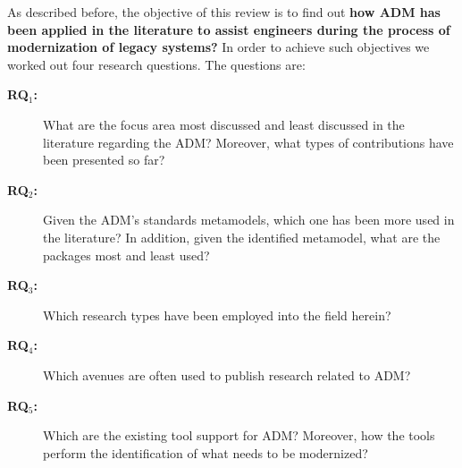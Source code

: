 

As described before, the objective of this review is to find out \textbf{how ADM has been applied in the literature to assist engineers during the process of modernization of legacy systems?} In order to achieve such objectives we worked out four research questions. The questions are:

\begin{description}

\item[\textbf{RQ$_1$:}] What are the focus area most discussed and least discussed in the literature regarding the ADM? Moreover, what types of contributions have been presented so far?

\item[\textbf{RQ$_2$:}] Given the ADM's standards metamodels, which one has been more used in the literature? In addition, given the identified metamodel, what are the packages most and least used?

\item[\textbf{RQ$_3$:}] Which research types have been employed into the field herein?

\item[\textbf{RQ$_4$:}] Which avenues are often used to publish research related to ADM?

\item[\textbf{RQ$_5$:}] Which are the existing tool support for ADM? Moreover, how the tools perform the identification of what needs to be modernized?






\end{description}

